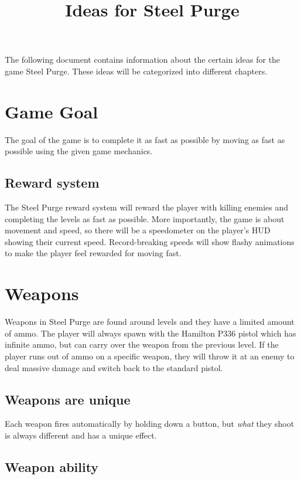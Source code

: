 \documentclass[12pt]{article}
\title{Ideas for Steel Purge}
\begin{document}
\maketitle{}

The following document contains information about the certain ideas for the game Steel Purge. These ideas will be categorized into different chapters.

\section{Game Goal}

The goal of the game is to complete it as fast as possible by moving as fast as possible using the given game mechanics. 

\subsection{Reward system}

The Steel Purge reward system will reward the player with killing enemies and completing the levels as fast as possible. More importantly, the game is about movement and speed, so there will be a speedometer on the player's HUD showing their current speed. Record-breaking speeds will show flashy animations to make the player feel rewarded for moving fast. 

\section{Weapons}

Weapons in Steel Purge are found around levels and they have a limited amount of ammo. The player will always spawn with the Hamilton P336 pistol which has infinite ammo, but can carry over the weapon from the previous level. If the player runs out of ammo on a specific weapon, they will throw it at an enemy to deal massive damage and switch back to the standard pistol. 

\subsection{Weapons are unique}

Each weapon fires automatically by holding down a button, but \emph{what} they shoot is always different and has a unique effect. 

\subsection{Weapon ability}
\end{document}
